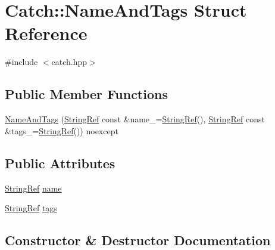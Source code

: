 \hypertarget{struct_catch_1_1_name_and_tags}{}\section{Catch\+::Name\+And\+Tags Struct Reference}
\label{struct_catch_1_1_name_and_tags}


{\ttfamily \#include $<$catch.\+hpp$>$}

\subsection*{Public Member Functions}
\begin{DoxyCompactItemize}
\item 
\mbox{\hyperlink{struct_catch_1_1_name_and_tags_ab585111e615ce8c504a2b9630de8ee94}{Name\+And\+Tags}} (\mbox{\hyperlink{class_catch_1_1_string_ref}{String\+Ref}} const \&name\+\_\+=\mbox{\hyperlink{class_catch_1_1_string_ref}{String\+Ref}}(), \mbox{\hyperlink{class_catch_1_1_string_ref}{String\+Ref}} const \&tags\+\_\+=\mbox{\hyperlink{class_catch_1_1_string_ref}{String\+Ref}}()) noexcept
\end{DoxyCompactItemize}
\subsection*{Public Attributes}
\begin{DoxyCompactItemize}
\item 
\mbox{\hyperlink{class_catch_1_1_string_ref}{String\+Ref}} \mbox{\hyperlink{struct_catch_1_1_name_and_tags_a7cbea60e0cebfa622c667008eb011420}{name}}
\item 
\mbox{\hyperlink{class_catch_1_1_string_ref}{String\+Ref}} \mbox{\hyperlink{struct_catch_1_1_name_and_tags_a74062ed1138834a348424eb7ed900c57}{tags}}
\end{DoxyCompactItemize}


\subsection{Constructor \& Destructor Documentation}
\mbox{\label{struct_catch_1_1_name_and_tags_ab585111e615ce8c504a2b9630de8ee94}} 
